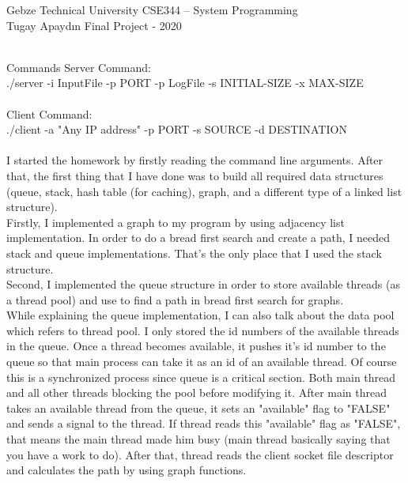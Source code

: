 \documentclass[12pt, a4paper]{article}
\begin{document}
\noindent Gebze Technical University \hfill CSE344 – System Programming\\
\noindent Tugay Apaydın \hfill Final Project - 2020\\
 \\

\justify

Commands
\justify
\small
Server Command:\\ ./server -i InputFile -p PORT -p LogFile -s INITIAL-SIZE -x MAX-SIZE\\\\
Client Command:\\ ./client -a "Any IP address" -p PORT -s SOURCE -d DESTINATION\\
\\

	I started the homework by firstly reading the command line arguments. After that, the first thing that I have done was to build all required data structures (queue, stack, hash table (for caching), graph, and a different type of a linked list structure).\\
	
	Firstly, I implemented a graph to my program by using adjacency list implementation. In order to do a bread first search and create a path, I needed stack and queue implementations. That's the only place that I used the stack structure.\\
	
	Second, I implemented the queue structure in order to store available threads (as a thread pool) and use to find a path in bread first search for graphs.\\
	
	While explaining the queue implementation, I can also talk about the data pool which refers to thread pool. I only stored the id numbers of the available threads in the queue. Once a thread becomes available, it pushes it's id number to the queue so that main process can take it as an id of an available thread. Of course this is a synchronized process since queue is a critical section. Both main thread and all other threads blocking the pool before modifying it. After main thread takes an available thread from the queue, it sets an "available" flag to "FALSE" and sends a signal to the thread. If thread reads this "available" flag as "FALSE", that means the main thread made him busy (main thread basically saying that you have a work to do). After that, thread reads the client socket file descriptor and calculates the path by using graph functions.\\
\end{document}
